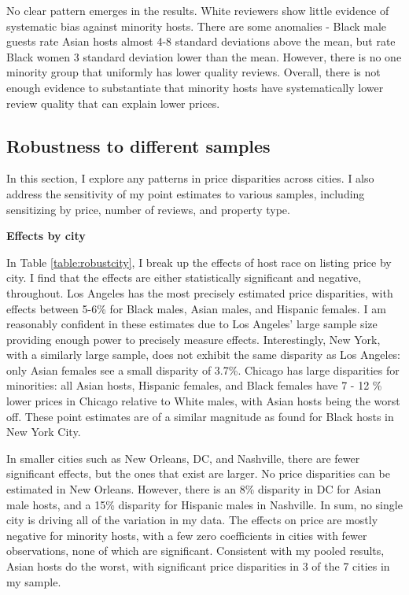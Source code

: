 No clear pattern emerges in the results. White reviewers show little evidence of systematic bias against minority hosts. There are some anomalies - Black male guests rate Asian hosts almost 4-8 standard deviations above the mean, but rate Black women 3 standard deviation lower than the mean. However, there is no one minority group that uniformly has lower quality reviews. Overall, there is not enough evidence to substantiate that minority hosts have systematically lower review quality that can explain lower prices. 









\subsection*{Robustness to  different samples}

In this section, I explore any patterns in price disparities across cities. I also address the sensitivity of my point estimates to various samples, including sensitizing by price, number of reviews, and property type.

\textbf{Effects by city}

In Table \ref{table:robustcity}, I break up the effects of host race on listing price by city. I find that the effects are either statistically significant and negative, throughout. Los Angeles has the most precisely estimated price disparities, with effects between 5-6\% for Black males, Asian males, and Hispanic females. I am reasonably confident in these estimates due to Los Angeles' large sample size providing enough power to precisely measure effects. Interestingly, New York, with a similarly large sample, does not exhibit the same disparity as Los Angeles: only Asian females see a small disparity of 3.7\%. Chicago has large disparities for minorities: all Asian hosts, Hispanic females, and Black females have 7 - 12 \% lower prices in Chicago relative to White males, with Asian hosts being the worst off. These point estimates are of a similar magnitude as \cite{edelman} found for Black hosts in New York City. 

In smaller cities such as New Orleans, DC, and Nashville, there are fewer significant effects, but the ones that exist are larger. No price disparities can be estimated in New Orleans. However, there is an 8\% disparity in DC for Asian male hosts, and a 15\% disparity for Hispanic males in Nashville. In sum, no single city is driving all of the variation in my data. The effects on price are mostly negative for minority hosts, with a few zero coefficients in cities with fewer observations, none of which are significant. Consistent with my pooled results, Asian hosts do the worst, with significant price disparities in 3 of the 7 cities in my sample. 


